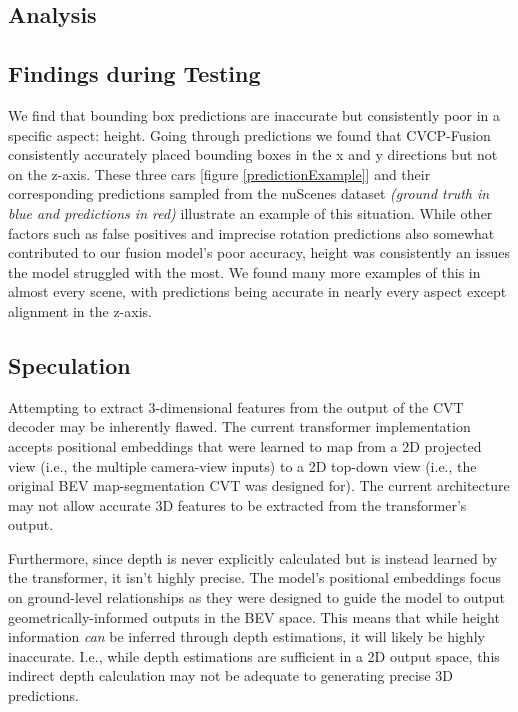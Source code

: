 \documentclass[a4paper,12pt]{article}
\begin{document}
\begin{multicols}{2}

\section{Analysis}
\subsection{Findings during Testing}
We find that bounding box predictions are inaccurate but consistently poor in a specific aspect: height. Going through predictions we found that CVCP-Fusion consistently accurately placed bounding boxes in the x and y directions but not on the z-axis. These three cars [figure \ref{predictionExample}] and their corresponding predictions sampled from the nuScenes dataset \textit{(ground truth in blue and predictions in red)} illustrate an example of this situation. While other factors such as false positives and imprecise rotation predictions also somewhat contributed to our fusion model's poor accuracy, height was consistently an issues the model struggled with the most. We found many more examples of this in almost every scene, with predictions being accurate in nearly every aspect except alignment in the z-axis.

\subsection{Speculation}
Attempting to extract 3-dimensional features from the output of the CVT decoder may be inherently flawed. The current transformer implementation accepts positional embeddings that were learned to map from a 2D projected view (i.e., the multiple camera-view inputs) to a 2D top-down view (i.e., the original BEV map-segmentation CVT was designed for). The current architecture may not allow accurate 3D features to be extracted from the transformer's output.

Furthermore, since depth is never explicitly calculated but is instead learned by the transformer, it isn't highly precise. The model's positional embeddings focus on ground-level relationships as they were designed to guide the model to output geometrically-informed outputs in the BEV space. This means that while height information \textit{can} be inferred through depth estimations, it will likely be highly inaccurate. I.e., while depth estimations are sufficient in a 2D output space, this indirect depth calculation may not be adequate to generating precise 3D predictions. 


\end{multicols}
\end{document}
